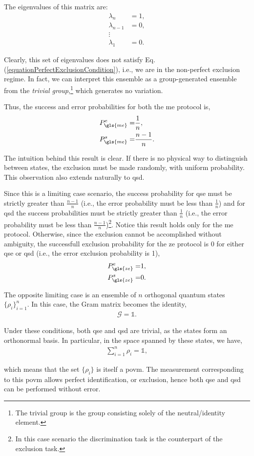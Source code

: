 \documentclass[12pt,letterpaper]{article}
\begin{document}
The eigenvalues of this matrix are:
\begin{align*}
	\lambda_n &= 1, \\
	\lambda_{n-1} &= 0, \\
	\vdots \\
	\lambda_1 &= 0.
\end{align*}

Clearly, this set of eigenvalues does not satisfy Eq. (\ref{equationPerfectExclusionCondition}), i.e., we are in the non-perfect exclusion regime. In fact, we can interpret this ensemble as a group-generated ensemble from the \emph{trivial group},\footnote{The trivial group is the group consisting solely of the neutral/identity element.} which generates no variation.

Thus, the success and error probabilities for both the \gls{me} protocol is,
\begin{align*}
	P_{\gls{me}}^e =& \frac{1}{n},\\
	P_{\gls{me}}^s =& \frac{n-1}{n}.
\end{align*}

The intuition behind this result is clear. If there is no physical way to distinguish between states, the exclusion must be made randomly, with uniform probability. This observation also extends naturally to \gls{qsd}.

Since this is a limiting case scenario, the success probability for \gls{qse} must be strictly greater than $\frac{n-1}{n}$ (i.e., the error probability must be less than $\frac{1}{n}$) and for \gls{qsd} the success probabilities must be strictly greater than $\frac{1}{n}$ (i.e., the error probability must be less than $\frac{n-1}{n}$)\footnote{In this case scenario the discrimination task is the counterpart of the exclusion task.}. Notice this result holds only for the \gls{me} protocol. Otherwise, since the exclusion cannot be accomplished without ambiguity, the successfull exclusion probability for the \gls{ze} protocol is 0 for either \gls{qse} or \gls{qsd} (i.e., the error exclusion probability is 1), 
\begin{align*}
	P_{\gls{ze}}^e =& 1,\\
	P_{\gls{ze}}^s =& 0.
\end{align*}

The opposite limiting case is an ensemble of $n$ orthogonal quantum states $\{\rho_i\}_{i=1}^{n}$. In this case, the Gram matrix becomes the identity,
\begin{align*}
	\mathcal{G} = \mathds{1}.
\end{align*}

Under these conditions, both \gls{qse} and \gls{qsd} are trivial, as the states form an orthonormal basis. In particular, in the space spanned by these states, we have,
\begin{align*}
	\sum_{i=1}^{n} \rho_i = \mathds{1},
\end{align*}

which means that the set $\{\rho_i\}$ is itself a \gls{povm}. The measurement corresponding to this \gls{povm} allows perfect identification, or exclusion, hence both \gls{qse} and \gls{qsd} can be performed without error.
\end{document}
